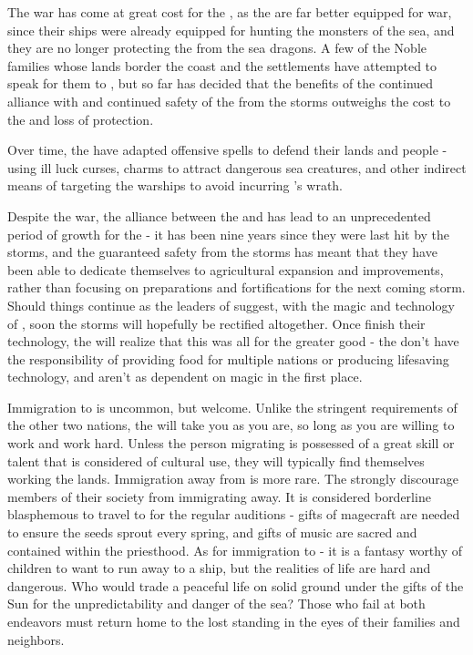 \documentclass[blue]{GL2020}
\begin{document}
The war has come at great cost for the \pFarm{}, as the \pShippies{} are far better equipped for war, since their ships were already equipped for hunting the monsters of the sea, and they are no longer protecting the \pFarm{} from the sea dragons.  A few of the Noble families whose lands border the coast and the \pShip{} settlements have attempted to speak for them to \cQueen{}, but so far \cQueen{\they} has decided that the benefits of the continued alliance with \pTechies{} and continued safety of the \pFarm{} from the storms outweighs the cost to the \pShip{} and loss of protection.

Over time, the \pFarm{} have adapted offensive spells to defend their lands and people - using ill luck curses, charms to attract dangerous sea creatures, and other indirect means of targeting the warships to avoid incurring \cFarmGod{}’s wrath.

Despite the war, the alliance between the \pFarm{} and \pTech{} has lead to an unprecedented period of growth for the \pFarmers{} - it has been nine years since they were last hit by the storms, and the guaranteed safety from the storms has meant that they have been able to dedicate themselves to agricultural expansion and improvements, rather than focusing on preparations and fortifications for the next coming storm.  Should things continue as the leaders of \pTech{} suggest, with the magic and technology of \pTech{}, soon the storms will hopefully be rectified altogether.  Once \pTech{} finish their technology, the \pShip{} will realize that this was all for the greater good - the \pShip{} don't have the responsibility of providing food for multiple nations or producing lifesaving technology, and aren't as dependent on magic in the first place.


Immigration to \pFarm{} is uncommon, but welcome.  Unlike the stringent requirements of the other two nations, the \pFarm{} will take you as you are, so long as you are willing to work and work hard.  Unless the person migrating is possessed of a great skill or talent that is considered of cultural use, they will typically find themselves working the lands.  Immigration away from \pFarm{} is more rare.  The \pFarmers{} strongly discourage members of their society from immigrating away.  It is considered borderline blasphemous to travel to \pTech{} for the regular auditions - gifts of magecraft are needed to ensure the seeds sprout every spring, and gifts of music are sacred and contained within the priesthood.  As for immigration to \pShip{} - it is a fantasy worthy of children to want to run away to a \pShippies{} ship, but the realities of \pShip{} life are hard and dangerous.  Who would trade a peaceful life on solid ground under the gifts of the Sun for the unpredictability and danger of the sea?  Those who fail at both endeavors must return home to the lost standing in the eyes of their families and neighbors.
\end{document}
